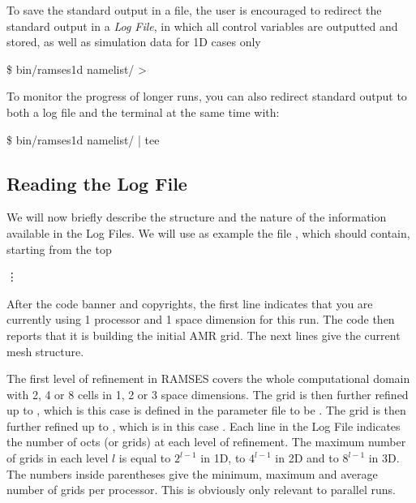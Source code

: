 
To save the standard output in a file, the user is encouraged to
redirect the standard output in a \emph{Log File}, in which all
control variables are outputted and stored, as well as simulation data
for 1D cases only

\begin{Prompt}
\$ bin/ramses1d namelist/{\nmlfilename} > {\logfilename}
\end{Prompt}
%
To monitor the progress of longer runs, you can also redirect standard output
to both a log file and the terminal at the same time with:
%
\begin{Prompt}
\$ bin/ramses1d namelist/{\nmlfilename} | tee {\logfilename}
\end{Prompt}

\clearpage %
\subsection{Reading the Log File}
We will now briefly describe the structure and the nature of the
information available in the Log Files. We will use as example the file
\cmd{\logfilename}, which should contain, starting from the top

%
\hskip 2cm \vdots
%

After the code banner and copyrights, the first line indicates that you are
currently using 1 processor and 1 space dimension for this run. The code then
reports that it is building the initial AMR grid. The next lines give the
current mesh structure.

The first level of refinement in RAMSES covers the whole computational domain
with 2, 4 or 8 cells in 1, 2 or 3 space dimensions. The grid is then further
refined up to , which is this case is defined in the
parameter file to be .  The grid is then further
refined up to , which is in this case
. Each line in the Log File indicates the number
of octs (or grids) at each level of refinement. The maximum number of grids in
each level $l$ is equal to $2^{l-1}$ in 1D, to $4^{l-1}$ in 2D and to $8^{l-1}$
in 3D. The numbers inside parentheses give the minimum, maximum and average
number of grids per processor. This is obviously only relevant to parallel
runs.

